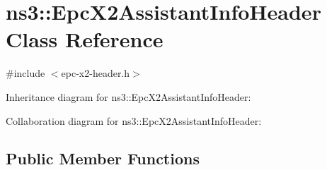 \hypertarget{classns3_1_1EpcX2AssistantInfoHeader}{}\section{ns3\+:\+:Epc\+X2\+Assistant\+Info\+Header Class Reference}
\label{classns3_1_1EpcX2AssistantInfoHeader}


{\ttfamily \#include $<$epc-\/x2-\/header.\+h$>$}



Inheritance diagram for ns3\+:\+:Epc\+X2\+Assistant\+Info\+Header\+:


Collaboration diagram for ns3\+:\+:Epc\+X2\+Assistant\+Info\+Header\+:
\subsection*{Public Member Functions}
